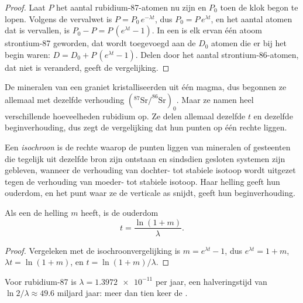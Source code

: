 \begin{proof}
Laat $P$ het aantal rubidium-87-atomen nu zijn en $P_0$ toen de klok
begon te lopen. Volgens de vervalwet is $P = P_0\,e^{-\lambda t}$, dus $P_0 = P\,e^{\lambda t}$,
en het aantal atomen dat is vervallen, is $P_0 - P = P\,(e^{\lambda t}-1)$.
In een  is elk ervan één atoom strontium-87 geworden, dat
wordt toegevoegd aan de $D_0$ atomen die er bij het begin waren: $D = D_0 + P\,(e^{\lambda
t}-1)$. Delen door het aantal strontium-86-atomen, dat niet is veranderd,
geeft de vergelijking.
\end{proof}

De mineralen van een graniet kristalliseerden uit één magma, dus begonnen ze allemaal
met dezelfde verhouding $(^{87}\mathrm{Sr}/^{86}\mathrm{Sr})_0$. Maar ze namen
heel verschillende hoeveelheden rubidium op. Ze delen allemaal dezelfde $t$ en dezelfde beginverhouding, dus
zegt de vergelijking dat hun punten op één rechte liggen.

\begin{definition}[Isochroon]\label{def:g12:age-of-the-earth:isochron}
Een \emph{isochroon} is de rechte waarop de
punten liggen van mineralen of gesteenten die tegelijk uit dezelfde
bron zijn ontstaan en sindsdien gesloten systemen zijn gebleven, wanneer de verhouding van dochter- tot
stabiele isotoop wordt uitgezet tegen de verhouding van moeder- tot stabiele isotoop. Haar
helling geeft hun ouderdom, en het punt waar ze de verticale as snijdt, geeft
hun beginverhouding.
\end{definition}

\begin{proposition}\label{prop:g12:age-of-the-earth:slope}
Als een  de helling $m$ heeft, is de ouderdom
\[
  t = \frac{\ln(1+m)}{\lambda}.
\]
\end{proposition}

\begin{proof}
Vergeleken met de isochroonvergelijking is $m = e^{\lambda t} - 1$, dus
$e^{\lambda t} = 1 + m$, $\lambda t = \ln(1+m)$, en $t = \ln(1+m)/\lambda$.
\end{proof}

Voor rubidium-87 is $\lambda = \num{1.3972e-11}$ per jaar, een halveringstijd van
$\ln 2/\lambda \approx 49.6$ miljard jaar: meer dan tien keer de .

